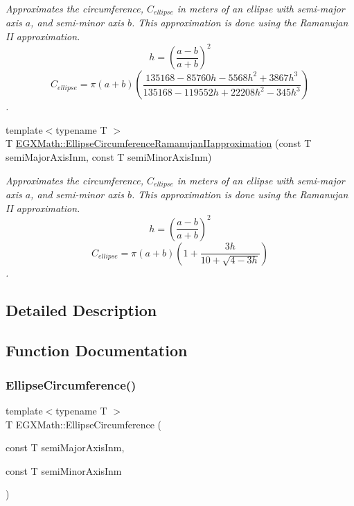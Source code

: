 \begin{DoxyCompactItemize}
\begin{DoxyCompactList}\small\item\em Approximates the circumference, $C_{ellipse}$ in meters of an ellipse with semi-\/major axis $a$, and semi-\/minor axis $b$. This approximation is done using the Ramanujan II approximation. \[ h=\left( \frac{a-b}{a+b} \right)^2 \] \[ C_{ellipse}=\pi (a + b) \left( \frac{135168-85760 h-5568 h^2+ 3867 h^3}{135168-119552 h+ 22208 h^2 - 345h^3} \right) \]. \end{DoxyCompactList}\item 
{\footnotesize template$<$typename T $>$ }\\T \mbox{\hyperlink{group___e_g_x_math-_geometry-2_d-_ellipse-_circumference_gaa908406db81fadc7c2d73e4e113d24d7}{E\+G\+X\+Math\+::\+Ellipse\+Circumference\+Ramanujan\+I\+Iapproximation}} (const T semi\+Major\+Axis\+Inm, const T semi\+Minor\+Axis\+Inm)
\begin{DoxyCompactList}\small\item\em Approximates the circumference, $C_{ellipse}$ in meters of an ellipse with semi-\/major axis $a$, and semi-\/minor axis $b$. This approximation is done using the Ramanujan II approximation. \[ h=\left( \frac{a-b}{a+b} \right)^2 \] \[ C_{ellipse}=\pi (a + b) \left( 1+\frac{3h}{10+\sqrt{4-3h}} \right) \]. \end{DoxyCompactList}\end{DoxyCompactItemize}


\subsection{Detailed Description}


\subsection{Function Documentation}
\mbox{\label{group___e_g_x_math-_geometry-2_d-_ellipse-_circumference_ga4172802ac674eb53467b44928ac635c7}} 
\subsubsection{\texorpdfstring{Ellipse\+Circumference()}{EllipseCircumference()}}
{\footnotesize\ttfamily template$<$typename T $>$ \\
T E\+G\+X\+Math\+::\+Ellipse\+Circumference (\begin{DoxyParamCaption}\item[{const T}]{semi\+Major\+Axis\+Inm,  }\item[{const T}]{semi\+Minor\+Axis\+Inm }\end{DoxyParamCaption})}




